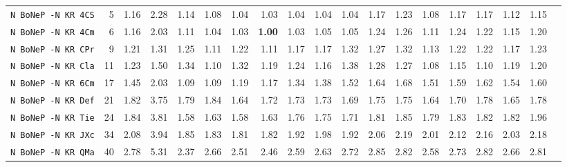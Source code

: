 \begin{tabular}{l | r @{~~} r | r@{~~}r@{~~}r@{~~}r@{~~}r@{~~}r@{~~}r@{~~}r@{~~}r@{~~}r@{~~}r@{~~}r@{~~}r@{~~}r@{~~}r@{~~}r|}
\verb+N BoNeP -N KR 4CS+ & 5 & 1.16 & 2.28&1.14&1.08&1.04&1.03&1.04&1.04&1.04&1.17&1.23&1.08&1.17&1.17&1.12&1.15\\
\verb+N BoNeP -N KR 4Cm+ & 6 & 1.16 & 2.03&1.11&1.04&1.03&\textbf{1.00}&1.03&1.05&1.05&1.24&1.26&1.11&1.24&1.22&1.15&1.20\\
\verb+N BoNeP -N KR CPr+ & 9 & 1.21 & 1.31&1.25&1.11&1.22&1.11&1.17&1.17&1.32&1.27&1.32&1.13&1.22&1.22&1.17&1.23\\
\verb+N BoNeP -N KR Cla+ & 11 & 1.23 & 1.50&1.34&1.10&1.32&1.19&1.24&1.16&1.38&1.28&1.27&1.08&1.15&1.10&1.19&1.20\\
\verb+N BoNeP -N KR 6Cm+ & 17 & 1.45 & 2.03&1.09&1.09&1.19&1.17&1.34&1.38&1.52&1.64&1.68&1.51&1.59&1.62&1.54&1.60\\
\verb+N BoNeP -N KR Def+ & 21 & 1.82 & 3.75&1.79&1.84&1.64&1.72&1.73&1.73&1.69&1.75&1.75&1.64&1.70&1.78&1.65&1.78\\
\verb+N BoNeP -N KR Tie+ & 24 & 1.84 & 3.81&1.58&1.63&1.58&1.63&1.76&1.75&1.71&1.81&1.85&1.79&1.83&1.82&1.82&1.96\\
\verb+N BoNeP -N KR JXc+ & 34 & 2.08 & 3.94&1.85&1.83&1.81&1.82&1.92&1.98&1.92&2.06&2.19&2.01&2.12&2.16&2.03&2.18\\
\verb+N BoNeP -N KR QMa+ & 40 & 2.78 & 5.31&2.37&2.66&2.51&2.46&2.59&2.63&2.72&2.85&2.82&2.58&2.73&2.82&2.66&2.81\\
\end{tabular}
